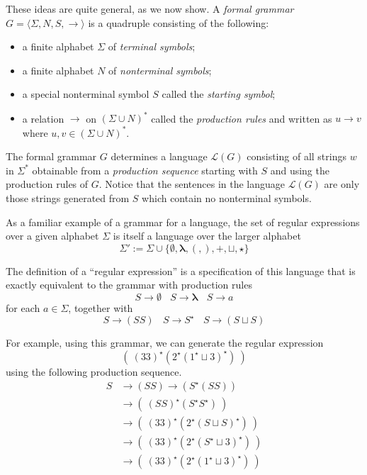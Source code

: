 \documentclass{article}
\newcommand{\El}{\mathcal L}
\newcommand{\emptysetb}{\mathbf \emptyset}
\newcommand{\lambdab}{\mathbf \lambda}
\begin{document}
These ideas are quite general, as we now show. A \emph{formal grammar} $G = \langle \Sigma, N, S, \to \rangle$ is a quadruple consisting of the following:
\begin{itemize}
  \item a finite alphabet $\Sigma$ of \emph{terminal symbols};
  \item a finite alphabet $N$ of \emph{nonterminal symbols};
  \item a special nonterminal symbol $S$ called the \emph{starting symbol};
  \item a relation $\to$ on $(\Sigma \cup N)^*$ called the \emph{production rules} and written as $u \to v$ where $u,v \in (\Sigma \cup N)^*$.
\end{itemize}

The formal grammar $G$ determines a language $\El(G)$ consisting of all strings $w$ in $\Sigma^*$ obtainable from a \emph{production sequence} starting with $S$ and using the production rules of $G$. Notice that the sentences in the language $\El(G)$ are only those strings generated from $S$ which contain no nonterminal symbols.

As a familiar example of a grammar for a language, the set of regular expressions over a given alphabet $\Sigma$ is itself a language over the larger alphabet
\begin{equation*}
\Sigma' := \Sigma \cup \{ \emptysetb, \lambdab, (, ), +, \sqcup, \star \}
\end{equation*}

The definition of a ``regular expression'' is a specification of this language that is exactly equivalent to the grammar with production rules
\begin{equation*}
S \to \emptysetb \ \ \ \ S \to \lambdab \ \ \ \ S \to a
\end{equation*}
for each $a \in \Sigma$, together with
\begin{equation*}
S \to (SS) \ \ \ \ S \to S^\star \ \ \ \ S \to (S \sqcup S)
\end{equation*}

For example, using this grammar, we can generate the regular expression
\begin{equation*}
(\ (33)^\star (2^\star (1^\star \sqcup 3)^\star) \ )
\end{equation*}
using the following production sequence.
\begin{align*}
S & \to (SS) \to (S^\star (SS)) \\
  & \to (\ (SS)^\star (S^\star S^\star) \ ) \\
  & \to (\ (33)^\star (2^\star (S \sqcup S)^\star) \ ) \\
  & \to (\ (33)^\star (2^\star (S^\star \sqcup 3)^\star) \ ) \\
  & \to (\ (33)^\star (2^\star (1^\star \sqcup 3)^\star) \ )
\end{align*}
\end{document}
